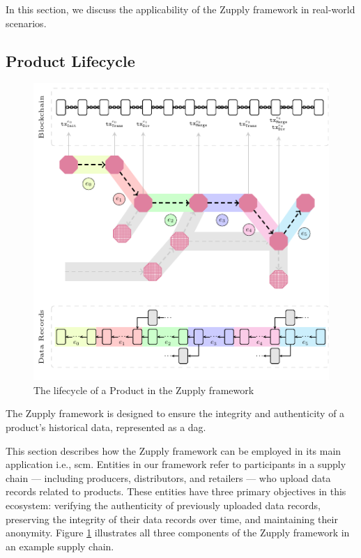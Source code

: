 In this section, we discuss the applicability of the Zupply framework in real-world scenarios.

\subsection{Product Lifecycle}

\begin{figure}[h]
    \centering
    \includegraphics[width=.6\linewidth]{Figures/ZupplyNetwork}
    \caption{The lifecycle of a Product in the Zupply framework}
    \label{fig:enter-label}
\end{figure}

The Zupply framework is designed to ensure the integrity and authenticity of a product's historical data, represented as a \gls{dag}. 

This section describes how the Zupply framework can be employed in its main application i.e., \gls{scm}. Entities in our framework refer to participants in a supply chain — including producers, distributors, and retailers — who upload data records related to products. These entities have three primary objectives in this ecosystem: verifying the authenticity of previously uploaded data records, preserving the integrity of their data records over time, and maintaining their anonymity. Figure \ref{fig:enter-label} illustrates all three components of the Zupply framework in an example supply chain.

